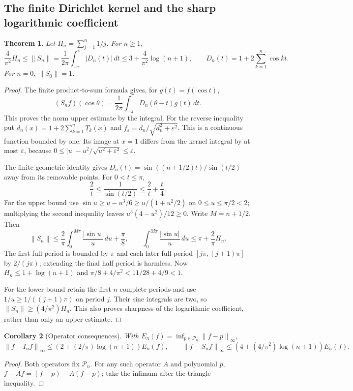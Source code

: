 \documentclass[11pt]{article}
\newcommand{\PP}{\mathcal P}
\newcommand{\norm}[1]{\left\lVert#1\right\rVert}
\newtheorem{theorem}{Theorem}[section]
\newtheorem{corollary}[theorem]{Corollary}
\theoremstyle{remark}\newtheorem{remark}[theorem]{Remark}
\begin{document}
\subsection{The finite Dirichlet kernel and the sharp logarithmic coefficient}
\begin{theorem}\label{thm:projection}
Let $H_n=\sum_{j=1}^n1/j$. For $n\ge1$,
\[
 \frac4{\pi^2}H_n\le\norm{S_n}
 =\frac1{2\pi}\int_{-\pi}^{\pi}|D_n(t)|\,dt
 \le3+\frac4{\pi^2}\log(n+1),
 \qquad D_n(t)=1+2\sum_{k=1}^n\cos kt.
\]
For $n=0$, $\norm{S_0}=1$.
\end{theorem}
\begin{proof}
The finite product-to-sum formula gives, for $g(t)=f(\cos t)$,
\[
 (S_nf)(\cos\theta)=\frac1{2\pi}\int_{-\pi}^\pi D_n(\theta-t)g(t)\,dt.
\]
This proves the norm upper estimate by the integral. For the reverse
inequality put $d_n(x)=1+2\sum_{k=1}^nT_k(x)$ and
$f_\varepsilon=d_n/\sqrt{d_n^2+\varepsilon^2}$. This is a continuous
function bounded by one. Its image at $x=1$ differs from the kernel
integral by at most $\varepsilon$, because
$0\le |u|-u^2/\sqrt{u^2+\varepsilon^2}\le\varepsilon$.

The finite geometric identity gives
$D_n(t)=\sin((n+1/2)t)/\sin(t/2)$ away from its removable points.
For $0<t\le\pi$,
\[
 \frac2t\le\frac1{\sin(t/2)}\le\frac2t+\frac t4.
\]
For the upper bound use $\sin u\ge u-u^3/6\ge u/(1+u^2/2)$ on
$0\le u\le\pi/2<2$; multiplying the second inequality leaves
$u^3(4-u^2)/12\ge0$. Write $M=n+1/2$. Then
\[
 \norm{S_n}\le\frac2\pi\int_0^{M\pi}\frac{|\sin u|}{u}\,du+\frac\pi8,
 \qquad
 \int_0^{M\pi}\frac{|\sin u|}{u}\,du\le\pi+\frac2\pi H_n.
\]
The first full period is bounded by $\pi$ and each later full period
$[j\pi,(j+1)\pi]$ by $2/(j\pi)$; extending the final half period is
harmless. Now $H_n\le1+\log(n+1)$ and
$\pi/8+4/\pi^2<11/28+4/9<1$.

For the lower bound retain the first $n$ complete periods and use
$1/u\ge1/((j+1)\pi)$ on period $j$. Their sine integrals are two, so
$\norm{S_n}\ge(4/\pi^2)H_n$. This also proves sharpness of the
logarithmic coefficient, rather than only an upper estimate.
\end{proof}

\begin{corollary}[Operator consequences]
With $E_n(f)=\inf_{p\in\PP_n}\norm{f-p}_\infty$,
\[
 \norm{f-I_nf}_\infty\le(2+(2/\pi)\log(n+1))E_n(f),\qquad
 \norm{f-S_nf}_\infty\le(4+(4/\pi^2)\log(n+1))E_n(f).
\]
\end{corollary}
\begin{proof}
Both operators fix $\PP_n$. For any such operator $A$ and polynomial $p$,
$f-Af=(f-p)-A(f-p)$; take the infimum after the triangle inequality.
\end{proof}
\end{document}
